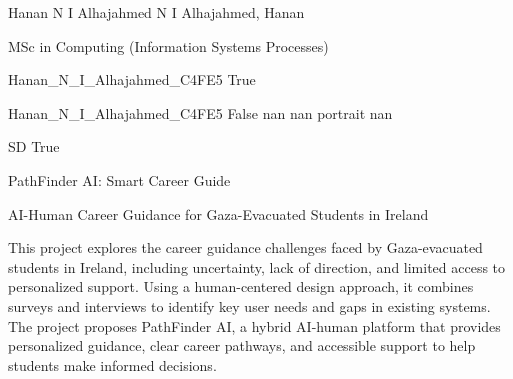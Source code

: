\documentclass[twoside]{report}
\begin{document}
\begingroup{}\relax



\def\Key{Hanan_N_I_Alhajahmed_C4FE5}

{Hanan N I Alhajahmed}
{N I Alhajahmed, Hanan}

{MSc in Computing (Information Systems Processes)}

{Hanan_N_I_Alhajahmed_C4FE5}
{True}

{Hanan_N_I_Alhajahmed_C4FE5}
{False}
{nan}
{nan}
{portrait}
{nan}

{SD}
{True}

{PathFinder AI: Smart Career Guide}

{AI-Human Career Guidance for Gaza-Evacuated Students in Ireland}

{This project explores the career guidance challenges faced by Gaza-evacuated students in Ireland, including uncertainty, lack of direction, and limited access to personalized support. Using a human-centered design approach, it combines surveys and interviews to identify key user needs and gaps in existing systems. The project proposes PathFinder AI, a hybrid AI-human platform that provides personalized guidance, clear career pathways, and accessible support to help students make informed decisions.}
\end{document}
